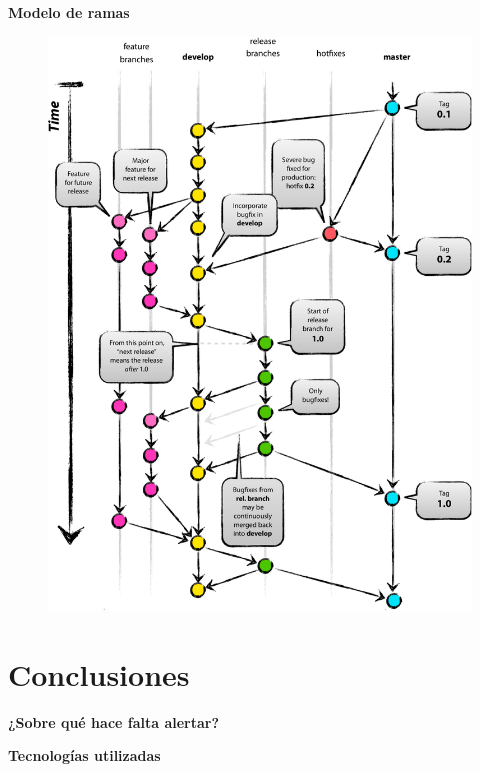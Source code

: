 \documentclass[11pt]{beamer}
\begin{document}
\begin{frame}{\textbf{\LARGE{Modelo de ramas}}}
	\vspace{-.7cm}
	\begin{figure}[H]
		{\includegraphics[height=.8\textheight]{./imagenes/Git-branching-model.pdf}}
	\end{figure}	
\end{frame}

\section{Conclusiones}



\begin{frame}{\textbf{\LARGE{¿Sobre qué hace falta alertar?}}}
\fontsize{18pt}{18}\selectfont

\end{frame}

\begin{frame}{\textbf{\LARGE{Tecnologías utilizadas}}}
\fontsize{18pt}{18}\selectfont
\end{frame}
\end{document}
